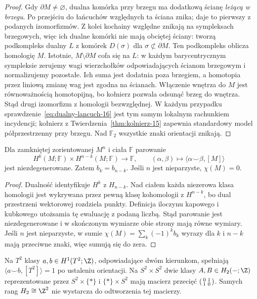 \begin{proof}
Gdy $\partial M\ne\varnothing$,
dualna komórka przy brzegu
ma dodatkową ścianę
\emph{leżącą w brzegu}.
Po przejściu do łańcuchów
względnych ta ściana znika;
daje to pierwszy z podanych
izomorfizmów. Z kolei
kochainy względne znikają
na sympleksach brzegowych,
więc ich dualne komórki
nie mają obciętej ściany:
tworzą podkompleks dualny $L$ z komórek
$D(\sigma)$ dla $\sigma\not\subset\partial M$.
Ten podkompleks oblicza homologię $M$.
Istotnie, $M\setminus\partial M$ cofa się na $L$:
w każdym barycentrycznym sympleksie zerujemy wagi
wierzchołków odpowiadających ścianom brzegowym
i normalizujemy pozostałe. Ich suma jest dodatnia
poza brzegiem, a homotopia przez liniową zmianę wag
jest zgodna na ścianach. Włączenie wnętrza do $M$
jest równoważnością homotopijną, bo kołnierz pozwala
odsunąć brzeg do wnętrza. Stąd drugi izomorfizm
z homologii bezwzględnej.
W każdym przypadku
sprawdzenie~\eqref{eq:dualny-lancuch-16}
jest tym samym lokalnym
rachunkiem incydencji;
kołnierz z
Twierdzenia~\ref{thm:kolnierz-15}
zapewnia standardowy model
półprzestrzenny przy brzegu.
Nad $\mathbb F_2$ wszystkie
znaki orientacji znikają.
\end{proof}

\begin{wniosek}
\label{cor:pd-parowanie-16}
Dla zamkniętej zorientowanej
$M^n$ i ciała $\mathbb F$
parowanie
\[
 H^k(M;\mathbb F)\times
 H^{n-k}(M;\mathbb F)
 \longrightarrow\mathbb F,\qquad
 (\alpha,\beta)\longmapsto
      \langle\alpha\smile\beta,[M]\rangle
\]
jest niezdegenerowane. Zatem
$b_k=b_{n-k}$. Jeśli $n$
jest nieparzyste, $\chi(M)=0$.
\end{wniosek}
\begin{proof}
Dualność identyfikuje
$H^k$ z $H_{n-k}$.
Nad ciałem każda niezerowa
klasa homologii jest wykrywana
przez pewną klasę kohomologii
z $H^{n-k}$, bo dual przestrzeni
wektorowej rozdziela punkty.
Definicja iloczynu kapowego
i kubkowego utożsamia tę
ewaluację z podaną liczbą.
Stąd parowanie jest
niezdegenerowane i w skończonym
wymiarze obie strony mają
równe wymiary. Jeśli $n$
jest nieparzyste, w sumie
$\chi(M)=\sum_k(-1)^kb_k$
wyrazy dla $k$ i $n-k$
mają przeciwne znaki,
więc sumują się do zera.
\end{proof}

\begin{przyklad}
Na $T^2$ klasy
$a,b\in H^1(T^2;\Z)$,
odpowiadające dwóm kierunkom,
spełniają
$\langle a\smile b,[T^2]\rangle=1$
po ustaleniu orientacji.
Na $S^2\times S^2$ dwie
klasy $A,B\in H_2(-;\Z)$
reprezentowane przez
$S^2\times\{*\}$ i
$\{*\}\times S^2$
mają macierz przecięć
$\begin{psmallmatrix}0&1\\1&0\end{psmallmatrix}$.
Samych rang $H_2\cong\Z^2$
nie wystarcza do odtworzenia
tej macierzy.
\end{przyklad}

